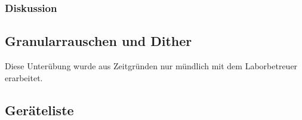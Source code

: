 \subsubsection{Diskussion}

%
%

\subsection{Granularrauschen und Dither}
Diese Unterübung wurde aus Zeitgründen nur mündlich mit dem Laborbetreuer erarbeitet. 

\subsection{Geräteliste}